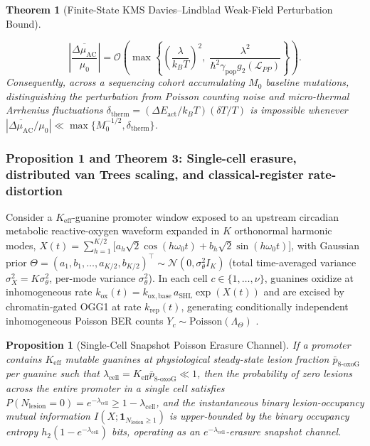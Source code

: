\documentclass[10pt,letterpaper]{article}
\theoremstyle{plain}
\newtheorem{theorem}{Theorem}
\newtheorem{proposition}{Proposition}
\theoremstyle{definition}
\newcommand{\Lcal}{\mathcal{L}}
\newcommand{\oxog}{\text{8-oxoG}}
\begin{document}
\begin{theorem}[Finite-State KMS Davies--Lindblad Weak-Field Perturbation Bound]
\begin{enumerate}[label=(\roman*),leftmargin=2em,itemsep=2pt]
    \begin{equation}
        \left|\frac{\overline{\Delta\mu_{\mathrm{AC}}}}{\mu_0}\right| = \mathcal{O}\!\left(\max\!\left\{\left(\frac{\lambda}{k_B T}\right)^{\!2},\; \frac{\lambda^2}{\hbar^2 \gamma_{\mathrm{pop}} g_2(\Lcal_{PP})}\right\}\right).
        \label{eq:rf_bound}
    \end{equation}
    Consequently, across a sequencing cohort accumulating $M_0$ baseline mutations, distinguishing the perturbation from Poisson counting noise and micro-thermal Arrhenius fluctuations $\delta_{\mathrm{therm}} = (\Delta E_{\mathrm{act}} / k_B T)(\delta T / T)$ is impossible whenever $|\overline{\Delta\mu_{\mathrm{AC}}} / \mu_0| \ll \max\{M_0^{-1/2}, \delta_{\mathrm{therm}}\}$.
\end{enumerate}
\end{theorem}

\subsubsection*{Proposition 1 and Theorem 3: Single-cell erasure, distributed van Trees scaling, and classical-register rate-distortion}

Consider a $K_{\mathrm{eff}}$-guanine promoter window exposed to an upstream circadian metabolic reactive-oxygen waveform expanded in $K$ orthonormal harmonic modes, $X(t) = \sum_{h=1}^{K/2} \bigl[a_h \sqrt{2}\cos(h\omega_0 t) + b_h \sqrt{2}\sin(h\omega_0 t)\bigr]$, with Gaussian prior $\Theta = (a_1,b_1,\dots,a_{K/2},b_{K/2})^\top \sim \mathcal{N}(0, \sigma_\theta^2 I_K)$ (total time-averaged variance $\sigma_X^2 = K\sigma_\theta^2$, per-mode variance $\sigma_\theta^2$). In each cell $c \in \{1,\dots,\nu\}$, guanines oxidize at inhomogeneous rate $k_{\mathrm{ox}}(t) = k_{\mathrm{ox,base}}\,a_{\mathrm{SHL}}\exp(X(t))$ and are excised by chromatin-gated OGG1 at rate $k_{\mathrm{rep}}(t)$, generating conditionally independent inhomogeneous Poisson BER counts $Y_c \sim \mathrm{Poisson}(\Lambda_\Theta)$ \cite{cordero2024natcommun,ren2024natcommun,li2025nar}.

\begin{proposition}[Single-Cell Snapshot Poisson Erasure Channel]
\label{prop:erasure}
If a promoter contains $K_{\mathrm{eff}}$ mutable guanines at physiological steady-state lesion fraction $\bar{p}_{\oxog}$ per guanine such that $\lambda_{\mathrm{cell}} = K_{\mathrm{eff}}\bar{p}_{\oxog} \ll 1$, then the probability of zero lesions across the entire promoter in a single cell satisfies $P(N_{\mathrm{lesion}} = 0) = e^{-\lambda_{\mathrm{cell}}} \ge 1 - \lambda_{\mathrm{cell}}$, and the instantaneous binary lesion-occupancy mutual information $I(X; \mathbf{1}_{N_{\mathrm{lesion}} \ge 1})$ is upper-bounded by the binary occupancy entropy $h_2(1 - e^{-\lambda_{\mathrm{cell}}})$ bits, operating as an $e^{-\lambda_{\mathrm{cell}}}$-erasure snapshot channel.
\end{proposition}
\end{document}
